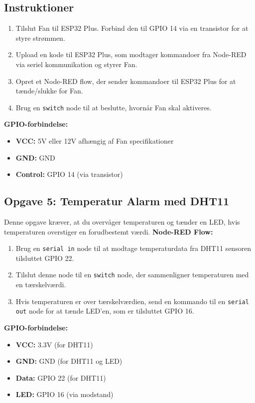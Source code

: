 \subsection{Instruktioner}
\begin{enumerate}
	\item Tilslut Fan til ESP32 Plus. Forbind den til GPIO 14 via en transistor for at styre strømmen.
	\item Upload en kode til ESP32 Plus, som modtager kommandoer fra Node-RED via seriel kommunikation og styrer Fan.
	\item Opret et Node-RED flow, der sender kommandoer til ESP32 Plus for at tænde/slukke for Fan.
	\item Brug en \texttt{switch} node til at beslutte, hvornår Fan skal aktiveres.
\end{enumerate}

\noindent\textbf{GPIO-forbindelse:}
\begin{itemize}
	\item \textbf{VCC:} 5V eller 12V afhængig af Fan specifikationer
	\item \textbf{GND:} GND
	\item \textbf{Control:} GPIO 14 (via transistor)
\end{itemize}

\subsection{Opgave 5: Temperatur Alarm med DHT11}
Denne opgave kræver, at du overvåger temperaturen og tænder en LED, hvis temperaturen overstiger en forudbestemt værdi.
\newline\newline\noindent
\textbf{Node-RED Flow:}
\begin{enumerate}
	\item Brug en \texttt{serial in} node til at modtage temperaturdata fra DHT11 sensoren tilsluttet GPIO 22.
	\item Tilslut denne node til en \texttt{switch} node, der sammenligner temperaturen med en tærskelværdi.
	\item Hvis temperaturen er over tærskelværdien, send en kommando til en \texttt{serial out} node for at tænde LED'en, som er tilsluttet GPIO 16.
\end{enumerate}
\noindent
\textbf{GPIO-forbindelse:}
\begin{itemize}
	\item \textbf{VCC:} 3.3V (for DHT11)
	\item \textbf{GND:} GND (for DHT11 og LED)
	\item \textbf{Data:} GPIO 22 (for DHT11)
	\item \textbf{LED:} GPIO 16 (via modstand)
\end{itemize}

